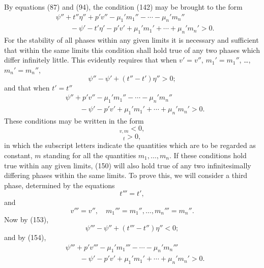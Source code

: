 \documentclass[11pt]{article}
\newcommand{\D}{\Delta}
\begin{document}
By equations (87) and (94), the condition (142) may be brought to the form
\begin{equation}
\begin{aligned}
&\psi''+t''\eta''+p'v''-\mu_1'm_1''-\cdots-\mu_n'm_n''\\
&\qquad{}-\psi'-t'\eta'-p'v'+\mu_1'm_1'+\cdots+\mu_n'm_n'>0.
\end{aligned}
\end{equation}
For the stability of all phases within any given limits it is necessary and sufficient that within the same limits this condition shall hold true of any two phases which differ infinitely little. This evidently requires that when $v'=v''$, $m_1'=m_1''$, \ldots, $m_n'=m_n''$,
\begin{equation}
\psi''-\psi'+(t''-t')\eta''>0;
\end{equation}
and that when $t'=t''$
\begin{equation}
\begin{aligned}
&\psi''+p'v''-\mu_1'm_1''-\cdots-\mu_n'm_n''\\
&\qquad{}-\psi'-p'v'+\mu_1'm_1'+\cdots+\mu_n'm_n'>0.
\end{aligned}
\end{equation}
These conditions may be written in the form
\begin{equation}
[\D\psi+\eta\D t]_{v,m}<0,
\end{equation}
\begin{equation}
[\D\psi+p\D v-\mu_1\D m_1-\cdots-\mu_n\D m_n]_{t}>0,
\end{equation}
in which the subscript letters indicate the quantities which are to be regarded as constant, $m$ standing for all the quantities $m_1,\ldots,m_n$. If these conditions hold true within any given limits, (150) will also hold true of any two infinitesimally differing phases within the same limits. To prove this, we will consider a third phase, determined by the equations
\begin{equation}
t'''=t',
\end{equation}
and
\begin{equation}
v'''=v'',\quad m_1'''=m_1'',\ldots,m_n'''=m_n''.
\end{equation}
Now by (153),
\begin{equation}
\psi'''-\psi''+(t'''-t'')\eta''<0;
\end{equation}
and by (154),
\begin{equation}
\begin{aligned}
&\psi'''+p'v'''-\mu_1'm_1'''-\cdots-\mu_n'm_n'''\\
&\qquad{}-\psi'-p'v'+\mu_1'm_1'+\cdots+\mu_n'm_n'>0.
\end{aligned}
\end{equation}
\end{document}
